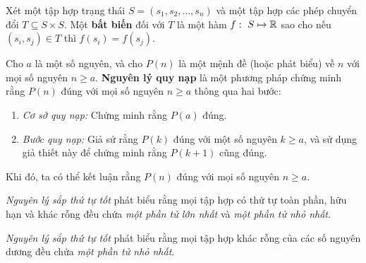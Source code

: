 \documentclass[../imo-training-open-book.tex]{subfiles}
\begin{document}
\begin{theorem*}
    \label{theorem:invariant-principle}
    Xét một tập hợp trạng thái \( S = (s_1, s_2, \ldots, s_n) \) và một tập hợp các phép chuyển đổi \( T \subseteq S \times S \).
    Một \textbf{bất biến} đối với \( T \) là một hàm \( f:\ S \mapsto \mathbb R \)
    sao cho nếu \( (s_i, s_j) \in T \) thì \( f(s_i) = f(s_j) \).
\end{theorem*}

\begin{theorem*}
    \label{theorem:induction-principle}
    Cho \( a \) là một số nguyên, và cho \( P(n) \) là một mệnh đề (hoặc phát biểu) về \( n \) với mọi số nguyên \( n \geq a \).
    \textbf{Nguyên lý quy nạp} là một phương pháp chứng minh rằng \( P(n) \) đúng với mọi số nguyên \( n \geq a \) thông qua hai bước:
    \begin{enumerate}[topsep=0pt, partopsep=0pt, itemsep=0pt]
        \item \textit{Cơ sở quy nạp:} Chứng minh rằng \( P(a) \) đúng.
        \item \textit{Bước quy nạp:} Giả sử rằng \( P(k) \) đúng với một số nguyên \( k \geq a \),
        và sử dụng giả thiết này để chứng minh rằng \( P(k+1) \) cũng đúng.
    \end{enumerate}
    Khi đó, ta có thể kết luận rằng \( P(n) \) đúng với mọi số nguyên \( n \geq a \).
\end{theorem*}

\begin{theorem*}
    \label{theorem:well-ordering-principle-on-finite-set}
    \textit{Nguyên lý sắp thứ tự tốt} phát biểu rằng mọi tập hợp có thứ tự toàn phần,
    hữu hạn và khác rỗng đều chứa \textit{một phần tử lớn nhất} và \textit{một phần tử nhỏ nhất}.
\end{theorem*}

\begin{theorem*}
    \label{theorem:well-ordering-principle}
    \textit{Nguyên lý sắp thứ tự tốt} phát biểu rằng mọi tập hợp khác rỗng của các số nguyên dương đều chứa \textit{một phần tử nhỏ nhất}.
\end{theorem*}
\end{document}
